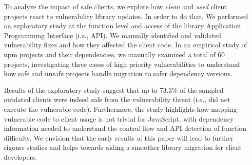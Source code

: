 To analyze the impact of safe clients, we explore how \textit{clean} and \textit{used} client projects react to vulnerability library updates. In order to do that,
We performed an exploratory study at the function level and access of the library Application Programming Interface (i.e., API). We manually identified and validated vulnerability fixes and how they affected the client code.
In an empirical study of npm projects and their dependencies, we manually examined a total of 60 projects, investigating three cases of high priority vulnerabilities to understand how safe and unsafe projects handle migration to safer dependency versions.

Results of the exploratory study suggest that up to 73.3\% of the sampled outdated clients were indeed safe from the vulnerability threat (i.e., did not execute the vulnerable code).
Furthermore, the study highlights how mapping vulnerable code to client usage is not trivial for JavaScript, with dependency information needed to understand the control flow and API detection of function difficulty.
We envision that the early results of this paper will lead to further rigours studies and helps towards aiding a smoother library migration for client developers.
 